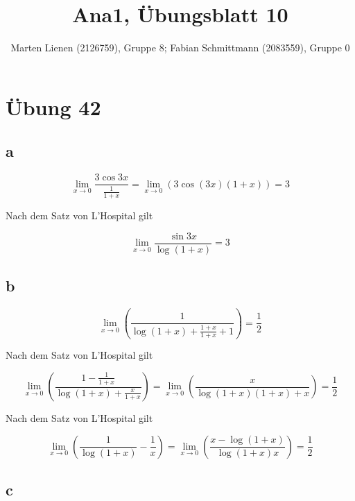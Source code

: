 \documentclass[a4paper,10pt]{article}
\title{Ana1, Übungsblatt 10}
\author{Marten Lienen (2126759), Gruppe 8; Fabian Schmittmann (2083559), Gruppe 0}
\begin{document}
\maketitle

\section*{Übung 42}

\subsection*{a}

\begin{equation}
 \lim_{x \rightarrow 0} \frac{3 \cos 3x}{\frac{1}{1 + x}} = \lim_{x \rightarrow 0}(3 \cos(3x)(1 + x)) = 3
\end{equation}

Nach dem Satz von L'Hospital gilt

\begin{equation}
 \lim_{x \rightarrow 0} \frac{\sin 3x}{\log (1 + x)} = 3
\end{equation}

\subsection*{b}

\begin{equation}
 \lim_{x \rightarrow 0} \left( \frac{1}{\log(1 + x) + \frac{1 + x}{1 + x} + 1} \right) = \frac{1}{2}
\end{equation}

Nach dem Satz von L'Hospital gilt

\begin{equation}
 \lim_{x \rightarrow 0} \left( \frac{1 - \frac{1}{1 + x}}{\log(1 + x) + \frac{x}{1 + x}} \right) = \lim_{x \rightarrow 0} \left( \frac{x}{\log(1 + x)(1 + x) + x} \right) = \frac{1}{2}
\end{equation}

Nach dem Satz von L'Hospital gilt

\begin{equation}
 \lim_{x \rightarrow 0} \left( \frac{1}{\log(1 + x)} - \frac{1}{x} \right) = \lim_{x \rightarrow 0} \left( \frac{x - \log(1 + x)}{\log(1 + x)x} \right) = \frac{1}{2}
\end{equation}

\subsection*{c}
\end{document}
